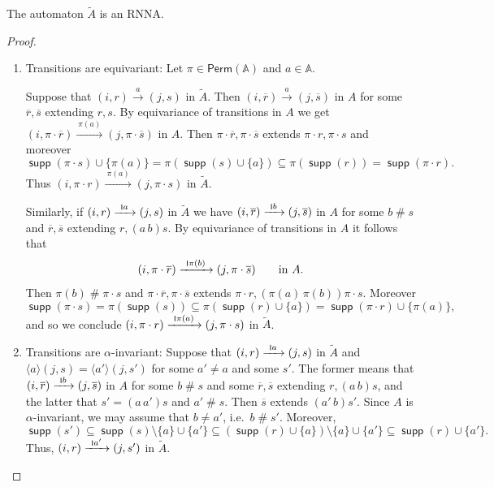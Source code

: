 \documentclass[final,a4paper,UKenglish,thm-restate,autoref,numberwithinsect]{lipics-v2021}
\newcommand{\scriptmidmid}{\hspace{0.2ex}{\rule[-0.1ex]{0.6pt}{1.1ex}}\hspace{0.2ex}}
\newcommand{\scriptnew}[1]{{\scriptmidmid}#1}
\numberwithin{equation}{section}
\newcommand{\ol}{\overline}
\newcommand{\xto}[1]{\xrightarrow{~#1~}}
\newcommand{\seq}{\subseteq}
\newcommand{\tl}{\widetilde}
\newcommand{\Perm}{\mathsf{Perm}}
\newcommand{\braket}[1]{\langle #1 \rangle}
\newcommand{\+}[1]{\mathcal{#1}\xspace}
\newcommand{\names}{\mathbb{A}}
\DeclareMathOperator{\supp}{\mathsf{supp}} %
\newcommand{\fresh}{\mathbin{\#}}
\theoremstyle{definition}
\begin{document}
%
\begin{lemma}
  The automaton $\tl{A}$ is an RNNA.
\end{lemma}
%
\begin{proof}
  \begin{enumerate}
  \item Transitions are equivariant: Let $\pi\in \Perm(\names)$ and
    $a\in \names$.

    Suppose that $(i,r)\xto{a} (j,s)$ in $\tl{A}$. Then
    $(i,\ol{r})\xto{a} (j,\ol{s})$ in $A$ for some $\ol{r}, \ol{s}$
    extending $r,s$. By equivariance of transitions in $A$ we get
    $(i,\pi\cdot \ol{r})\xto{\pi(a)} (j,\pi\cdot \ol{s})$ in $A$. Then
    $\pi\cdot \ol{r},\pi\cdot \ol{s}$ extends
    $\pi\cdot {r}, \pi \cdot s$ and moreover
    \[
      \supp(\pi\cdot s)\cup \{\pi(a)\}
      =
      \pi(\supp(s)\cup \{a\})
      \seq
      \pi(\supp(r))
      =
      \supp(\pi\cdot r).
    \]
    Thus $(i,\pi\cdot {r})\xto{\pi(a)} (j,\pi\cdot {s})$ in $\tl{A}$.

    Similarly, if $(i,r)\xto{\scriptnew a} (j,s)$ in $\tl{A}$ we have
    $(i,\ol{r})\xto{\scriptnew b} (j,\ol{s})$ in $A$ for some $b\fresh s$ and
    $\ol{r}, \ol{s}$ extending $r, (a\, b) s$. By equivariance of
    transitions in $A$ it follows that
    \[
      (i,\pi\cdot \ol{r})\xto{\scriptnew \pi(b)} (j,\pi\cdot \ol{s})
      \qquad\text{in $A$.}
    \]
    Then $\pi(b)\fresh \pi\cdot s$ and
    $\pi\cdot \ol{r},\pi\cdot \ol{s}$ extends
    $\pi\cdot {r}, (\pi(a)\, \pi(b)) \pi\cdot s$. Moreover
    \[
      \supp(\pi\cdot s)
      =
      \pi(\supp(s)) \seq \pi(\supp(r)\cup \{a\})
      =
      \supp(\pi\cdot r)\cup \{\pi(a)\},
    \]
    and so we conclude
    $(i,\pi\cdot {r})\xto{\scriptnew \pi(a)} (j,\pi\cdot {s})$ in $\tl{A}$.

  \item Transitions are $\alpha$-invariant: Suppose that
    $(i,r)\xto{\scriptnew a} (j,s)$ in $\tl{A}$ and
    $\braket{a} (j,s)=\braket{a'} (j,s')$ for some $a'\neq a$ and some
    $s'$. The former means that $(i,\ol{r})\xto{\scriptnew b} (j,\ol{s})$ in $A$
    for some $b\fresh s$ and some $\ol{r},\ol{s}$ extending
    $r,(a\,b)s$, and the latter that $s'=(a\, a')s$ and $a'\fresh
    s$. Then $\ol {s}$ extends $(a'\, b)s'$. Since $A$ is
    $\alpha$-invariant, we may assume that $b\neq a'$, i.e.\
    $b\fresh s'$. Moreover,
    \[
      \supp(s')
      \seq
      \supp(s)\setminus \{a\}\cup \{a'\}
      \seq
      (\supp(r)\cup \{a\})\setminus \{a\} \cup \{a'\}
      \seq
      \supp(r)\cup \{a'\}.
    \]
    Thus, $(i,r)\xto{\scriptnew a'} (j,s')$ in $\tl{A}$.
  

\end{enumerate}
\end{proof}
\end{document}
